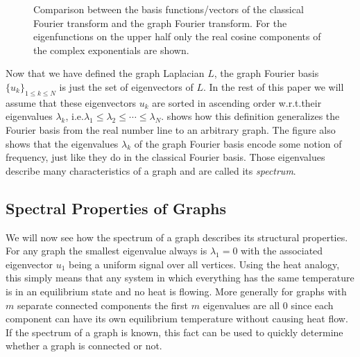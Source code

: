\begin{figure}
	\centering
	\caption{
		Comparison between the basis functions/vectors of the classical Fourier transform and the graph Fourier transform.
		For the eigenfunctions on the upper half only the real cosine components of the complex exponentials are shown.
	}\label{fig:sgt:graphFourier}
\end{figure}
Now that we have defined the graph Laplacian $L$, the graph Fourier basis ${\{ u_k \}}_{1 \leq k \leq N}$ is just the set of eigenvectors of $L$.
In the rest of this paper we will assume that these eigenvectors $u_k$ are sorted in ascending order w.r.t.\@ their eigenvalues $\lambda_k$, i.e.\@ $\lambda_1 \leq \lambda_2 \leq \cdots \leq \lambda_N$.
 shows how this definition generalizes the Fourier basis from the real number line to an arbitrary graph.
The figure also shows that the eigenvalues $\lambda_k$ of the graph Fourier basis encode some notion of frequency, just like they do in the classical Fourier basis.
Those eigenvalues describe many characteristics of a graph and are called its \textit{spectrum}.

\subsection{Spectral Properties of Graphs}%
\label{sec:sgt:spectrum}

We will now see how the spectrum of a graph describes its structural properties.
For any graph the smallest eigenvalue always is $\lambda_1 = 0$ with the associated eigenvector $u_1$ being a uniform signal over all vertices.
Using the heat analogy, this simply means that any system in which everything has the same temperature is in an equilibrium state and no heat is flowing.
More generally for graphs with $m$ separate connected components the first $m$ eigenvalues are all $0$ since each component can have its own equilibrium temperature without causing heat flow.
If the spectrum of a graph is known, this fact can be used to quickly determine whether a graph is connected or not.

